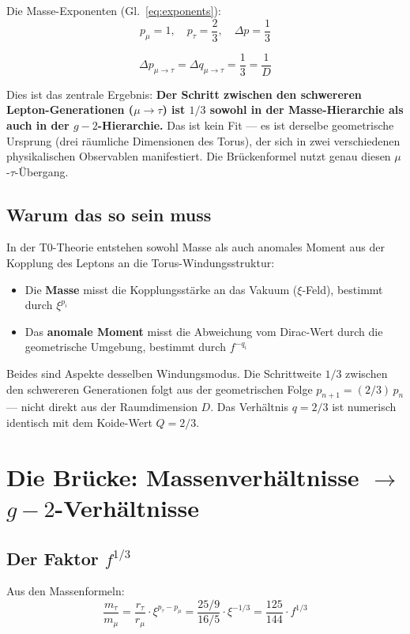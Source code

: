 Die Masse-Exponenten (Gl.~\ref{eq:exponents}):
\begin{equation}
	p_\mu = 1, \quad p_\tau = \frac{2}{3}, \quad \Delta p = \frac{1}{3}
\end{equation}

\begin{equation}
	\boxed{\Delta p_{\mu\to\tau} = \Delta q_{\mu\to\tau} = \frac{1}{3} = \frac{1}{D}}
\end{equation}

Dies ist das zentrale Ergebnis: \textbf{Der Schritt zwischen den schwereren Lepton-Generationen ($\mu\to\tau$) ist $1/3$ sowohl in der Masse-Hierarchie als auch in der $g-2$-Hierarchie.} Das ist kein Fit — es ist derselbe geometrische Ursprung (drei räumliche Dimensionen des Torus), der sich in zwei verschiedenen physikalischen Observablen manifestiert. Die Brückenformel nutzt genau diesen $\mu$-$\tau$-Übergang.

\subsection{Warum das so sein muss}

In der T0-Theorie entstehen sowohl Masse als auch anomales Moment aus der Kopplung des Leptons an die Torus-Windungsstruktur:
\begin{itemize}
	\item Die \textbf{Masse} misst die Kopplungsstärke an das Vakuum ($\xi$-Feld), bestimmt durch $\xi^{p_i}$
	\item Das \textbf{anomale Moment} misst die Abweichung vom Dirac-Wert durch die geometrische Umgebung, bestimmt durch $f^{-q_i}$
\end{itemize}
Beides sind Aspekte desselben Windungsmodus. Die Schrittweite $1/3$
zwischen den schwereren Generationen folgt aus der geometrischen Folge
$p_{n+1} = (2/3)\,p_n$ — nicht direkt aus der Raumdimension $D$.
Das Verhältnis $q = 2/3$ ist numerisch identisch mit dem Koide-Wert
$Q = 2/3$.

\section{Die Brücke: Massenverhältnisse $\to$ $g-2$-Verhältnisse}

\subsection{Der Faktor $f^{1/3}$}

Aus den Massenformeln:
\begin{equation}
	\frac{m_\tau}{m_\mu} = \frac{r_\tau}{r_\mu} \cdot \xi^{p_\tau - p_\mu} 
	= \frac{25/9}{16/5} \cdot \xi^{-1/3} = \frac{125}{144} \cdot f^{1/3}
	\label{eq:massratio}
\end{equation}


